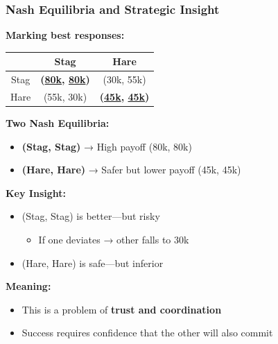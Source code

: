 \begin{frame}[fragile]\frametitle{Nash Equilibria and Strategic Insight}

\textbf{Marking best responses:}

\begin{center}
\begin{tabular}{|c|c|c|}
  \hline
  & Stag & Hare \\
  \hline
  Stag & \textbf{(\underline{80k}, \underline{80k})} & (30k, 55k) \\
  \hline
  Hare & (55k, 30k) & \textbf{(\underline{45k}, \underline{45k})} \\
  \hline
\end{tabular}
\end{center}

\vspace{6pt}

\textbf{Two Nash Equilibria:}
\begin{itemize}
  \item \textbf{(Stag, Stag)} → High payoff (80k, 80k)
  \item \textbf{(Hare, Hare)} → Safer but lower payoff (45k, 45k)
\end{itemize}

\vspace{6pt}

\textbf{Key Insight:}

\begin{itemize}
  \item (Stag, Stag) is better—but risky
  \begin{itemize}
    \item If one deviates → other falls to 30k
  \end{itemize}
  
  \item (Hare, Hare) is safe—but inferior
\end{itemize}

\vspace{6pt}

\textbf{Meaning:}
\begin{itemize}
  \item This is a problem of \textbf{trust and coordination}
  \item Success requires confidence that the other will also commit
\end{itemize}

\end{frame}

